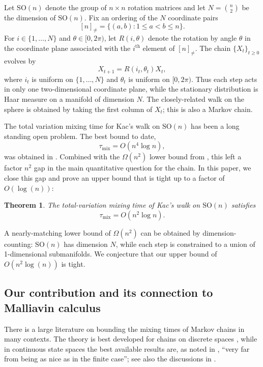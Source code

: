 \documentclass[11pt, reqno]{amsart}
\numberwithin{equation}{section}
\newtheorem{theorem}{Theorem}
\theoremstyle{remark}
\newcommand{\1}{\mathbf{1}}
\newcommand{\SO}{\mathrm{SO}}
\newcommand{\mix}{\mathrm{mix}}
\begin{document}
Let $\SO(n)$ denote the group of $n\times n$ rotation matrices and let $N=\binom{n}{2}$ be the dimension of $\SO(n)$. Fix an ordering of the $N$ coordinate pairs
\[
[n]_{\neq}=\{(a,b):1\le a<b\le n\}.
\]
For $i\in\{1,\dots,N\}$ and $\theta\in[0,2\pi)$, let $R(i,\theta)$ denote the rotation by angle $\theta$ in the coordinate plane associated with the $i^\mathrm{th}$ element of $[n]_{\neq}$. The chain $\{X_t\}_{t\ge0}$ evolves by
\begin{equation}
\label{eq:kac-update}
X_{t+1}=R(i_t,\theta_t)X_t,
\end{equation}
where $i_t$ is uniform on $\{1,\dots,N\}$ and $\theta_t$ is uniform on $[0,2\pi)$. Thus each step acts in only one two-dimensional coordinate plane, while the stationary distribution is Haar measure on a manifold of dimension $N$. The closely-related walk on the sphere is obtained by taking the first column of $X_{t}$; this is also a Markov chain.


The total variation mixing time for Kac's walk on $\SO(n)$ has been a long standing open problem. The best bound to date,
\[
\tau_{\mix}=O(n^4\log n),
\]
was obtained in \cite[Theorem~1.1]{PillaiSmith}. Combined with the $\Omega(n^2)$ lower bound from \cite{PillaiSmith}, this left a factor $n^2$ gap in the main quantitative question for the chain. In this paper, we close this gap and prove an upper bound that is tight up to a factor of $O(\log(n))$:

\begin{theorem}
\label{thm:main}
The total-variation mixing time of Kac's walk on $\SO(n)$ satisfies
\[
\tau_{\mix}=O(n^2\log n).
\]
\end{theorem}

A nearly-matching lower bound of $\Omega(n^{2})$ can be obtained by dimension-counting: $\SO(n)$ has dimension $N$, while each step is constrained to a union of 1-dimensional submanifolds. We conjecture that our upper bound of $O(n^{2} \log(n))$ is tight.

\subsection{Our contribution and its connection to Malliavin calculus}

There is a large literature on bounding the mixing times of Markov chains in many contexts. The theory is best developed for chains on discrete spaces \cite{levin2017markov}, while in continuous state spaces the best available results are, as noted in \cite{Lacoin2021ParticleSystems}, “very far from being as nice as in the finite case”; see also the discussions in \cite{CaputoLabbeLacoin2020AdjacentSimplex,LabbePetit2025BiasedAdjacentSimplex,CaputoLabbeLacoin2022GibbsNablaPhi}.
\end{document}
